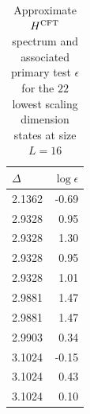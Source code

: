 \documentclass[10pt, a4paper]{article}
\begin{document}
{\begin{enumerate}
\begin{table}
\begin{minipage}{.5\linewidth}
          \begin{tabular}{lr}
            \toprule
            $\Delta$ & $\log \epsilon$ \\
            \midrule
            2.1362 & -0.69 \\
            2.9328 & 0.95 \\
            2.9328 & 1.30 \\
            2.9328 & 0.95 \\
            2.9328 & 1.01 \\
            2.9881 & 1.47 \\
            2.9881 & 1.47 \\
            2.9903 & 0.34 \\
            3.1024 & -0.15 \\
            3.1024 & 0.43 \\
            3.1024 & 0.10 \\
            \bottomrule
            \end{tabular}
        \end{minipage} 

      \caption{Approximate $H^{\rm CFT}$ spectrum and associated primary test $\epsilon$ for the $22$ lowest scaling dimension states at size $L=16$ \label{spectrum_eps}}
  \end{table}
  

\end{enumerate}}
\end{document}
